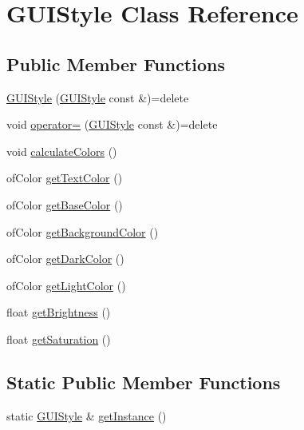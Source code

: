 \hypertarget{class_g_u_i_style}{}\section{G\+U\+I\+Style Class Reference}
\label{class_g_u_i_style}
\subsection*{Public Member Functions}
\begin{DoxyCompactItemize}
\item 
\hyperlink{class_g_u_i_style_a8e1f0cf754c901dd452beb98f518d152}{G\+U\+I\+Style} (\hyperlink{class_g_u_i_style}{G\+U\+I\+Style} const \&)=delete
\item 
void \hyperlink{class_g_u_i_style_a2cb598ebf5929b19899db5f51c941bac}{operator=} (\hyperlink{class_g_u_i_style}{G\+U\+I\+Style} const \&)=delete
\item 
void \hyperlink{class_g_u_i_style_abbb9bb05ac09085d8cb00ae5830e3800}{calculate\+Colors} ()
\item 
of\+Color \hyperlink{class_g_u_i_style_a89fb46a154fc64e5e668e5e86dfc2b2d}{get\+Text\+Color} ()
\item 
of\+Color \hyperlink{class_g_u_i_style_a9a928e63bae234313d990b94a9e7c03f}{get\+Base\+Color} ()
\item 
of\+Color \hyperlink{class_g_u_i_style_a0249715f2fa01bef0c343502e4975585}{get\+Background\+Color} ()
\item 
of\+Color \hyperlink{class_g_u_i_style_aa2c6ac1c7d7671c14f04884137254661}{get\+Dark\+Color} ()
\item 
of\+Color \hyperlink{class_g_u_i_style_a3efdd51e19fc2ee1da71a52dce9240c8}{get\+Light\+Color} ()
\item 
float \hyperlink{class_g_u_i_style_a1eb9d7d106f76832cc4386d886c9d2e0}{get\+Brightness} ()
\item 
float \hyperlink{class_g_u_i_style_a8e144ad547eda85e84c9d5f9174c7306}{get\+Saturation} ()
\end{DoxyCompactItemize}
\subsection*{Static Public Member Functions}
\begin{DoxyCompactItemize}
\item 
static \hyperlink{class_g_u_i_style}{G\+U\+I\+Style} \& \hyperlink{class_g_u_i_style_a1fec60550b47121fb9c514f8dfe4337f}{get\+Instance} ()
\end{DoxyCompactItemize}
